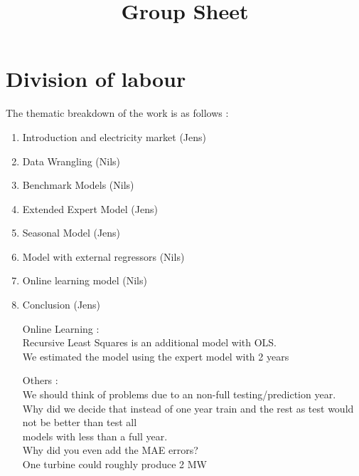 \documentclass[]{article}
\title{Group Sheet}
\author{}
\date{}
\begin{document}
\maketitle



\section*{Division of labour}

The thematic breakdown of the work is as follows :
\begin{enumerate}
	\item Introduction and electricity market (Jens)
	\item Data Wrangling (Nils)
	\item Benchmark Models (Nils)
	\item Extended Expert Model (Jens)
	\item Seasonal Model (Jens)
	\item Model with external regressors (Nils)
	\item Online learning model (Nils)
	\item Conclusion (Jens) 
	
	
	Online Learning :\\\newline
	Recursive Least Squares is an additional model with OLS. \\\newline
	We estimated the model using the expert model with 2 years \\\newline
	
	Others : \\\newline
	We should think of problems due to an non-full testing/prediction year.\\\newline
	Why did we decide that instead of one year train and the rest as test would not be better than test all\\\newline
	 models with less than a full year. \\\newline
	Why did you even add the MAE errors?\\\newline
	One turbine could roughly produce 2 MW\\\newline
	

\end{enumerate}
\end{document}
